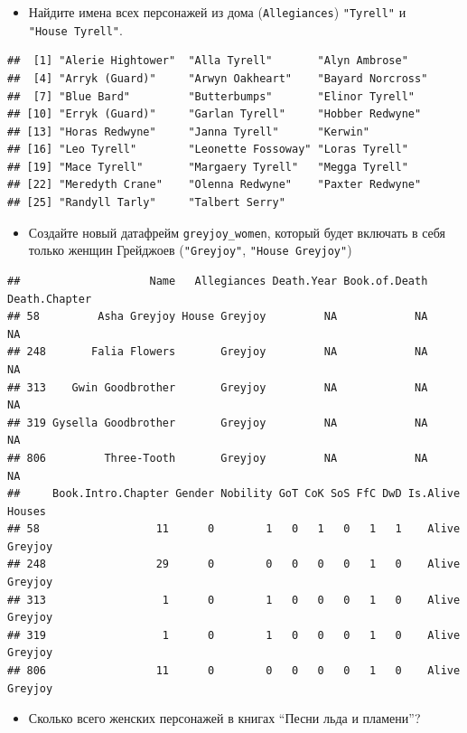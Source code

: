 \documentclass[]{book}
\providecommand{\tightlist}{%
  \setlength{\itemsep}{0pt}\setlength{\parskip}{0pt}}
\begin{document}
\begin{itemize}
\tightlist
\item
  Найдите имена всех персонажей из дома (\texttt{Allegiances})
  \texttt{"Tyrell"} и \texttt{"House\ Tyrell"}.
\end{itemize}

\begin{verbatim}
##  [1] "Alerie Hightower"  "Alla Tyrell"       "Alyn Ambrose"     
##  [4] "Arryk (Guard)"     "Arwyn Oakheart"    "Bayard Norcross"  
##  [7] "Blue Bard"         "Butterbumps"       "Elinor Tyrell"    
## [10] "Erryk (Guard)"     "Garlan Tyrell"     "Hobber Redwyne"   
## [13] "Horas Redwyne"     "Janna Tyrell"      "Kerwin"           
## [16] "Leo Tyrell"        "Leonette Fossoway" "Loras Tyrell"     
## [19] "Mace Tyrell"       "Margaery Tyrell"   "Megga Tyrell"     
## [22] "Meredyth Crane"    "Olenna Redwyne"    "Paxter Redwyne"   
## [25] "Randyll Tarly"     "Talbert Serry"
\end{verbatim}

\begin{itemize}
\tightlist
\item
  Создайте новый датафрейм \texttt{greyjoy\_women}, который будет
  включать в себя только женщин Грейджоев (\texttt{"Greyjoy"},
  \texttt{"House\ Greyjoy"})
\end{itemize}

\begin{verbatim}
##                    Name   Allegiances Death.Year Book.of.Death Death.Chapter
## 58         Asha Greyjoy House Greyjoy         NA            NA            NA
## 248       Falia Flowers       Greyjoy         NA            NA            NA
## 313    Gwin Goodbrother       Greyjoy         NA            NA            NA
## 319 Gysella Goodbrother       Greyjoy         NA            NA            NA
## 806         Three-Tooth       Greyjoy         NA            NA            NA
##     Book.Intro.Chapter Gender Nobility GoT CoK SoS FfC DwD Is.Alive  Houses
## 58                  11      0        1   0   1   0   1   1    Alive Greyjoy
## 248                 29      0        0   0   0   0   1   0    Alive Greyjoy
## 313                  1      0        1   0   0   0   1   0    Alive Greyjoy
## 319                  1      0        1   0   0   0   1   0    Alive Greyjoy
## 806                 11      0        0   0   0   0   1   0    Alive Greyjoy
\end{verbatim}

\begin{itemize}
\tightlist
\item
  Сколько всего женских персонажей в книгах ``Песни льда и пламени''?
\end{itemize}
\end{document}
